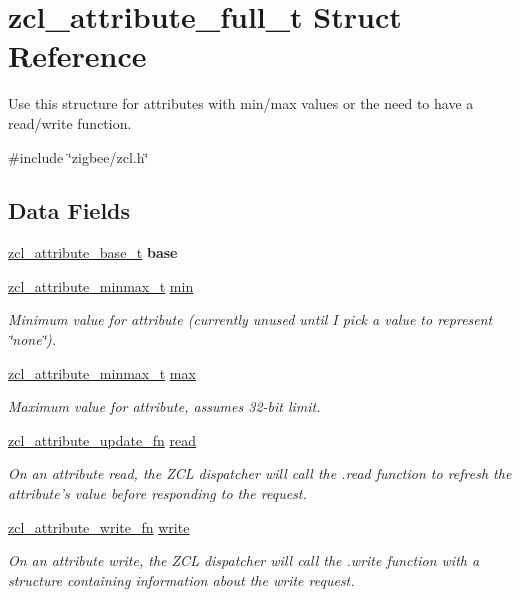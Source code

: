 \hypertarget{structzcl__attribute__full__t}{\section{zcl\-\_\-attribute\-\_\-full\-\_\-t Struct Reference}
\label{structzcl__attribute__full__t}
}


Use this structure for attributes with min/max values or the need to have a read/write function.  




{\ttfamily \#include \char`\"{}zigbee/zcl.\-h\char`\"{}}

\subsection*{Data Fields}
\begin{DoxyCompactItemize}
\item 
\hypertarget{group__zcl_ga8f041b4b145b30d5f92acdcb08ba43a3}{\hyperlink{structzcl__attribute__base__t}{zcl\-\_\-attribute\-\_\-base\-\_\-t} {\bfseries base}}\label{group__zcl_ga8f041b4b145b30d5f92acdcb08ba43a3}

\item 
\hyperlink{unionzcl__attribute__minmax__t}{zcl\-\_\-attribute\-\_\-minmax\-\_\-t} \hyperlink{group__zcl_gaad888af9d07cd3b611c75f15f8c90dfe}{min}
\begin{DoxyCompactList}\small\item\em Minimum value for attribute (currently unused until I pick a value to represent \char`\"{}none\char`\"{}). \end{DoxyCompactList}\item 
\hyperlink{unionzcl__attribute__minmax__t}{zcl\-\_\-attribute\-\_\-minmax\-\_\-t} \hyperlink{group__zcl_gae2490849003f8344782c06334b1e6b17}{max}
\begin{DoxyCompactList}\small\item\em Maximum value for attribute, assumes 32-\/bit limit. \end{DoxyCompactList}\item 
\hyperlink{group__zcl_ga9a022bce8add8364fde3ab5cc75354ef}{zcl\-\_\-attribute\-\_\-update\-\_\-fn} \hyperlink{group__zcl_ga80943597b8cce9d751a45efa823596ac}{read}
\begin{DoxyCompactList}\small\item\em On an attribute read, the Z\-C\-L dispatcher will call the .read function to refresh the attribute's value before responding to the request. \end{DoxyCompactList}\item 
\hyperlink{group__zcl_ga9024d6fb96d7fa35d13f7531efe3d6fb}{zcl\-\_\-attribute\-\_\-write\-\_\-fn} \hyperlink{group__zcl_gac8bd2f85f7df500d34b1d3cd27033a4e}{write}
\begin{DoxyCompactList}\small\item\em On an attribute write, the Z\-C\-L dispatcher will call the .write function with a structure containing information about the write request. \end{DoxyCompactList}\end{DoxyCompactItemize}


